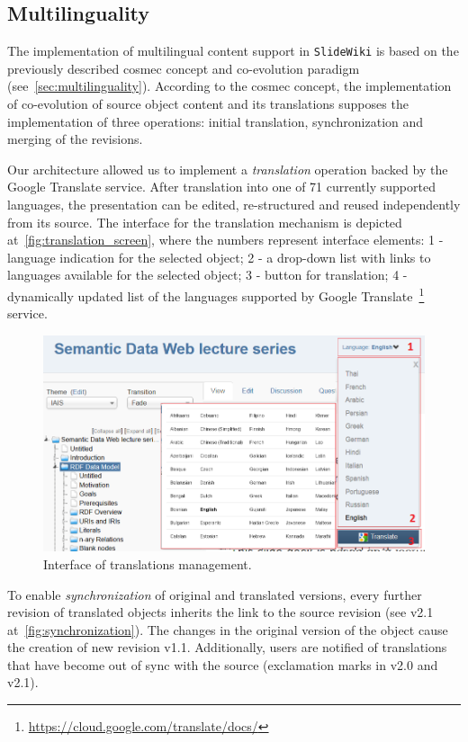 \documentclass[PhD, Submit, ngerman,UKenglish,table]{scrbook}
\begin{document}
\subsection{Multilinguality}
\label{sec:multilinguality_impl}

The implementation of multilingual content support in \texttt{SlideWiki} is based on the previously described \gls{cosmec} concept and co-evolution paradigm (see~\autoref{sec:multilinguality}).
According to the \gls{cosmec} concept, the implementation of co-evolution of source object content and its translations supposes the implementation of three operations: initial translation, synchronization and merging of the revisions.

Our architecture allowed us to implement a \emph{translation} operation backed by the Google Translate service.
After translation into one of 71 currently supported languages, the presentation can be edited, re-structured and reused independently from its source.
The interface for the translation mechanism is depicted at~\autoref{fig:translation_screen}, where the numbers represent interface elements: 1 - language indication for the selected object; 2 - a drop-down list with links to languages available for the selected object; 3 - button for translation; 4 - dynamically updated list of the languages supported by Google Translate~\footnote{\url{https://cloud.google.com/translate/docs/}} service.

\begin{figure}[!htb]
	\centering
		\includegraphics[width=\textwidth]{Images/translation_screen.png}
	\caption{Interface of translations management.}
	\label{fig:translation_screen}
\end{figure}

To enable \emph{synchronization} of original and translated versions, every further revision of translated objects inherits the link to the source revision (see v2.1 at~\autoref{fig:synchronization}).
The changes in the original version of the object cause the creation of new revision v1.1.
Additionally, users are notified of translations that have become out of sync with the source (exclamation marks in v2.0 and v2.1).
\end{document}
